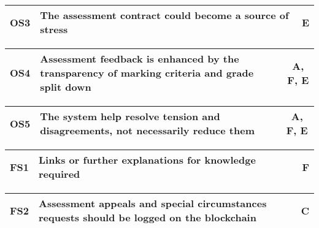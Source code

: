 \begin{table}[!ht]
	\begin{tabularx}{\textwidth}{|c|X|c|}
		\hline
		OS3 & \textbf{The assessment contract could become a source of stress} & E \\
		\hline
	\end{tabularx}
\end{table}

\begin{table}[!ht]
	\begin{tabularx}{\textwidth}{|c|X|c|}
		\hline
		OS4 & \textbf{Assessment feedback is enhanced by the transparency of marking criteria and grade split down} & A, F, E \\
		\hline
	\end{tabularx}
\end{table}

\begin{table}[!ht]
	\begin{tabularx}{\textwidth}{|c|X|c|}
		\hline
		OS5 & \textbf{The system help resolve tension and disagreements, not necessarily reduce them} & A, F, E \\
		\hline
	\end{tabularx}
\end{table}

\begin{table}[!ht]
	\begin{tabularx}{\textwidth}{|c|X|c|}
		\hline
		FS1 & \textbf{Links or further explanations for knowledge required} & F \\
		\hline
	\end{tabularx}
\end{table}

\begin{table}[!ht]
	\begin{tabularx}{\textwidth}{|c|X|c|}
		\hline
		FS2 & \textbf{Assessment appeals and special circumstances requests should be logged on the blockchain} & C \\
		\hline
	\end{tabularx}
\end{table}

